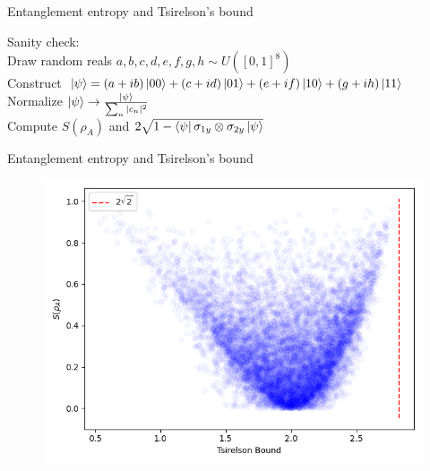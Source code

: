 \documentclass[aspectratio=1610]{beamer}					%
\begin{document}
\begin{frame}{Entanglement entropy and Tsirelson's bound}

Sanity check:\\
\vspace{0.2in}
Draw random reals $a,b,c,d,e,f,g,h\sim U([0,1]^{8})$\\
\vspace{0.2in}
Construct $\ket{\psi} = (a+ib)\ket{00} + (c+id)\ket{01} + (e+if)\ket{10} + (g+ih)\ket{11}$\\
\vspace{0.2in}
Normalize $\ket{\psi} \rightarrow \frac{\ket{\psi}}{\sum_{n}|c_{n}|^{2}}$\\
\vspace{0.2in}
Compute $S(\rho_{A})$ and $2\sqrt{1-\bra{\psi}\sigma_{1y}\otimes\sigma_{2y}\ket{\psi}}$
\end{frame}

\begin{frame}{Entanglement entropy and Tsirelson's bound}

\begin{figure}
\includegraphics[scale=0.65]{bell.png}
\end{figure}

\end{frame}
\end{document}
